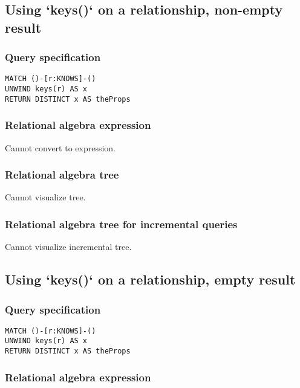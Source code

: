 \subsection{Using `keys()` on a relationship, non-empty result}

\subsubsection*{Query specification}

\begin{lstlisting}
MATCH ()-[r:KNOWS]-()
UNWIND keys(r) AS x
RETURN DISTINCT x AS theProps
\end{lstlisting}

\subsubsection*{Relational algebra expression}

Cannot convert to expression.

\subsubsection*{Relational algebra tree}

Cannot visualize tree.

\subsubsection*{Relational algebra tree for incremental queries}

Cannot visualize incremental tree.

\subsection{Using `keys()` on a relationship, empty result}

\subsubsection*{Query specification}

\begin{lstlisting}
MATCH ()-[r:KNOWS]-()
UNWIND keys(r) AS x
RETURN DISTINCT x AS theProps
\end{lstlisting}

\subsubsection*{Relational algebra expression}

